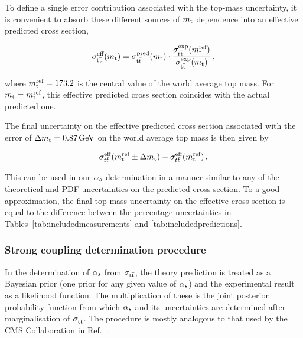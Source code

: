 To define a single error contribution associated with the
top-mass uncertainty, it is convenient to absorb these different
sources of $m_{\mathrm{t}}$ dependence into an effective predicted cross section,
\begin{linenomath*}
\begin{equation}
  \label{eq:eff-mtop-dep}
\sigma_{\mathrm{t}\overline{\mathrm{t}}}^{\text{eff}}(m_{\mathrm{t}}) = 
    \sigma_{\mathrm{t}\overline{\mathrm{t}}}^{\text{pred}} (  m_{\mathrm{t}}  ) \cdot 
        \frac{
            \sigma_{\mathrm{t}\overline{\mathrm{t}}}^{\text{exp}} (  m_{\mathrm{t}}^{\text{ref}}  )
            }{
            \sigma_{\mathrm{t}\overline{\mathrm{t}}}^{\text{exp}} (  m_{\mathrm{t}}  )
            }\,,
\end{equation}
\end{linenomath*}
where $m_{\mathrm{t}}^{\text{ref}} = 173.2$ is the central value of the world average top
mass.
%
For $m_{\mathrm{t}} = m_{\mathrm{t}}^{\text{ref}}$, this effective predicted cross section coincides
with the actual predicted one.

The final uncertainty on the effective predicted cross section
associated with the error of $\Delta m_{\mathrm{t}} = 0.87\,\text{GeV}$ on the world
average top mass is then given by
\begin{linenomath*}
\begin{equation}
  \label{eq:mtop-uncertainty-impact}
  \sigma_{t\bar{t}}^{\text{eff}}(m_{\mathrm{t}}^{\text{ref}} \pm \Delta m_{\mathrm{t}}) - 
  \sigma_{t\bar{t}}^{\text{eff}}(m_{\mathrm{t}}^{\text{ref}})\,.
\end{equation}
\end{linenomath*}
This can be used in our $\alpha_s$ determination in a manner similar to
any of the theoretical and PDF uncertainties on the predicted cross
section.
% 
To a good approximation, the final top-mass uncertainty on the
effective cross section is equal to the difference between the
percentage uncertainties in Tables~\ref{tab:includedmeasurements} and
\ref{tab:includedpredictions}.
%

\subsubsection{Strong coupling determination procedure}
\label{sec:determination-procedure}

In the determination of $\alpha_s$ from $\sigma_{\mathrm{t}\overline{\mathrm{t}}}$, the theory prediction is
treated as a Bayesian prior (one prior for any given value of $\alpha_s$)
and the experimental result as a likelihood function.  The
multiplication of these is the joint posterior probability function
from which $\alpha_s$ and its uncertainties are determined after
marginalisation of $\sigma_{\mathrm{t}\overline{\mathrm{t}}}$.  The procedure is mostly analogous to that
used by the CMS Collaboration in Ref.~\cite{Chatrchyan:2013haa}.


